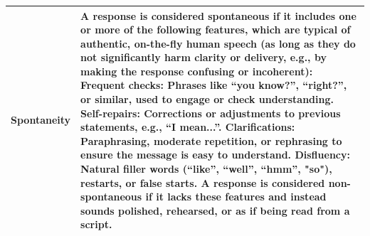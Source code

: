 \begin{table}[h]
\begin{tabular}{p{4.3cm} p{11.4cm}}
\textbf{Spontaneity} & A response is considered \textbf{spontaneous} if it includes one or more of the following features, which are typical of authentic, on-the-fly human speech (as long as they do not significantly harm clarity or delivery, e.g., by making the response confusing or incoherent): \textbf{Frequent checks:} Phrases like “you know?”, “right?”, or similar, used to engage or check understanding. \textbf{Self-repairs:} Corrections or adjustments to previous statements, e.g., “I mean...”. \textbf{Clarifications:} Paraphrasing, moderate repetition, or rephrasing to ensure the message is easy to understand. \textbf{Disfluency:} Natural filler words (“like”, “well”, “hmm”, "so"), restarts, or false starts. A response is considered \textbf{non-spontaneous} if it lacks these features and instead sounds polished, rehearsed, or as if being read from a script.\\
\bottomrule
\end{tabular}
\label{table:semantic_rubric}
\end{table}
